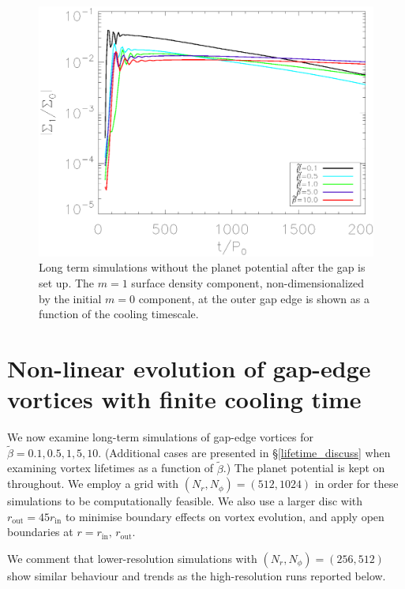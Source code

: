 \begin{figure}
  \includegraphics[width=\linewidth,clip=true,trim=0.5cm
  0cm 0cm 1.1cm]{figures/longterm_planetoff}
  \caption{Long term simulations without the planet potential after
    the gap is set up. The $m=1$ surface density component,
    non-dimensionalized by the initial $m=0$ component, at the
    outer gap edge is shown as a function of the cooling timescale. 
  } \label{planetofflifetimeplot}
\end{figure}


\section{Non-linear evolution of
  gap-edge vortices with finite cooling time}\label{nonlinear} 
We now examine long-term simulations of gap-edge vortices for
$\tilde{\beta}=0.1,0.5,1,5,10$. (Additional cases are presented in 
  \S\ref{lifetime_discuss} when examining vortex lifetimes as a
  function of $\tilde{\beta}$.)  The planet potential is kept on
throughout. We employ a grid with $(N_r,N_{\phi})=(512,1024)$ in order
for these 
simulations to be computationally feasible. We also use a larger
disc with $r_{\mathrm{out}}=45r_{\mathrm{in}}$ to minimise boundary
effects on vortex evolution, and apply open boundaries at
$r=r_\mathrm{in},\,r_\mathrm{out}$. 

We comment that lower-resolution simulations with
$(N_r,N_{\phi})=(256,512)$ show similar behaviour and trends as the
high-resolution runs reported below. %

